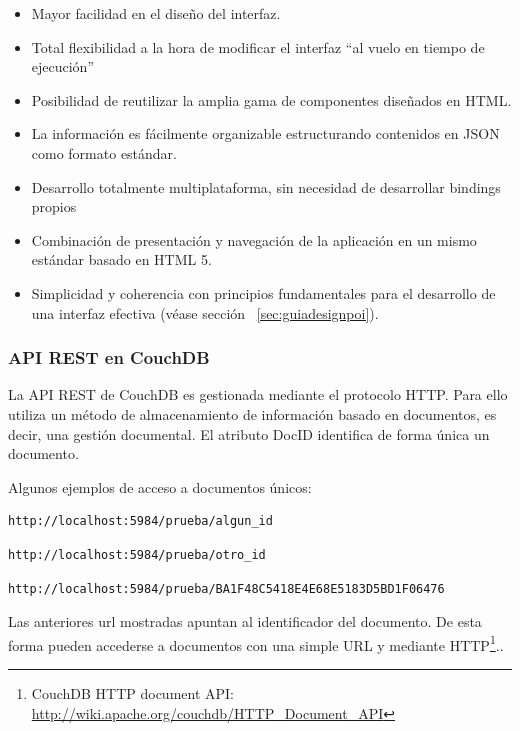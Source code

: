 \begin{itemize}
  \item Mayor facilidad en el diseño del interfaz.
  \item Total flexibilidad a la hora de modificar el interfaz ``al vuelo en
tiempo de ejecución''
  \item Posibilidad de reutilizar la amplia gama de componentes diseñados en
HTML.
  \item La información es fácilmente organizable estructurando contenidos en
 JSON como formato estándar.
  \item Desarrollo totalmente multiplataforma, sin necesidad de desarrollar
  bindings propios
 \item Combinación de presentación y navegación de la aplicación en un mismo
estándar basado en HTML 5.
 \item Simplicidad y coherencia con principios fundamentales para el desarrollo
de una interfaz efectiva (véase sección ~\ref{sec:guiadesignpoi}).
\end{itemize}

\subsubsection{API REST en CouchDB}
\label{sec:apirest}

La API REST de CouchDB es gestionada mediante el protocolo HTTP. Para ello
utiliza un método de almacenamiento de información basado en documentos, es
decir, una gestión documental. El atributo DocID identifica de forma única un
documento.

Algunos ejemplos de acceso a documentos únicos:

\begin{lstlisting}[language={bash}, texcl=false, caption={Ejemplo 1 CouchDB}]
http://localhost:5984/prueba/algun_id
\end{lstlisting}

\begin{lstlisting}[language={bash}, texcl=false, caption={Ejemplo 2 CouchDB}]
http://localhost:5984/prueba/otro_id
\end{lstlisting}

\begin{lstlisting}[language={bash}, texcl=false, caption={Ejemplo 3 CouchDB}]
http://localhost:5984/prueba/BA1F48C5418E4E68E5183D5BD1F06476
\end{lstlisting}  

Las anteriores url mostradas apuntan al identificador del documento. De esta
forma pueden accederse a documentos con una simple URL y mediante HTTP\footnote{CouchDB HTTP document API:\\
\url{http://wiki.apache.org/couchdb/HTTP_Document_API}}..


